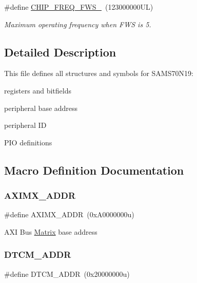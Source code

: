 \begin{DoxyCompactItemize}
\mbox{\label{group__SAMS70N19__definitions_ga3b66824f858591135877b369f98d48a5}} 
\#define \mbox{\hyperlink{group__SAMS70N19__definitions_ga3b66824f858591135877b369f98d48a5}{C\+H\+I\+P\+\_\+\+F\+R\+E\+Q\+\_\+\+F\+W\+S\+\_}}~(123000000\+U\+L)
\begin{DoxyCompactList}\small\item\em Maximum operating frequency when F\+WS is 5. \end{DoxyCompactList}\end{DoxyCompactItemize}


\subsection{Detailed Description}
This file defines all structures and symbols for S\+A\+M\+S70\+N19\+:
\begin{DoxyItemize}
\item registers and bitfields
\item peripheral base address
\item peripheral ID
\item P\+IO definitions 
\end{DoxyItemize}

\subsection{Macro Definition Documentation}
\mbox{\label{group__SAMS70N19__definitions_ga2fb7cc681bf5e7fbce5e3635b72a330a}} 
\subsubsection{\texorpdfstring{AXIMX\_ADDR}{AXIMX\_ADDR}}
{\footnotesize\ttfamily \#define A\+X\+I\+M\+X\+\_\+\+A\+D\+DR~(0x\+A0000000u)}

A\+XI Bus \mbox{\hyperlink{structMatrix}{Matrix}} base address \mbox{\label{group__SAMS70N19__definitions_ga26626a425f7ebb3a0c2dbc276f0d9f78}} 
\subsubsection{\texorpdfstring{DTCM\_ADDR}{DTCM\_ADDR}}
{\footnotesize\ttfamily \#define D\+T\+C\+M\+\_\+\+A\+D\+DR~(0x20000000u)}

